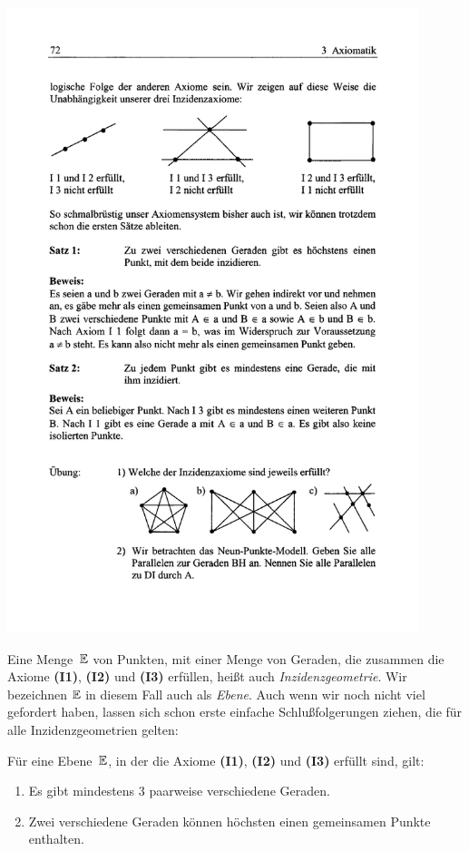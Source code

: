 \centerline{\includegraphics[width=12cm]{BILDER/BildUnabhaengigkeitInzidenzaxiome.pdf}}





Eine Menge~$\mathbb E$ von Punkten, mit einer Menge %
von Geraden, die zusammen die
Axiome  {\bf(I1)},  {\bf(I2)} und {\bf(I3)} erfüllen, heißt auch {\em
  Inzidenzgeometrie}. Wir bezeichnen $\mathbb E$ in diesem Fall auch als 
{\em Ebene}.
Auch wenn wir noch nicht viel gefordert haben, lassen sich schon
erste einfache Schlußfolgerungen ziehen, die für alle Inzidenzgeometrien gelten:


\begin{thm}
Für eine Ebene~$\mathbb E$, in der die Axiome {\bf(I1)},  {\bf(I2)} und
{\bf(I3)} erfüllt sind, gilt:
\begin{enumerate}
\item  Es gibt mindestens 3 paarweise verschiedene Geraden.

\item
Zwei verschiedene Geraden können höchsten einen gemeinsamen
  Punkte enthalten.

\end{enumerate}
\end{thm}

